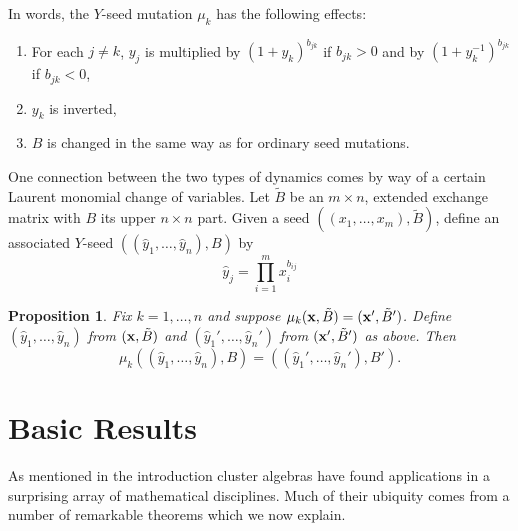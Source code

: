 \documentclass{amsart}
\newtheorem{proposition}[theorem]{Proposition}
\theoremstyle{definition}
\theoremstyle{remark}
\numberwithin{equation}{section}
\newcommand{\x}{{\bf x}}
\begin{document}
	In words, the $Y$-seed mutation $\mu_k$ has the following effects:
	\begin{enumerate}
	\item For each $j \neq k$, $y_j$ is multiplied by $(1+y_k)^{b_{jk}}$ if $b_{jk}>0$ and by $(1+y_k^{-1})^{b_{jk}}$ if $b_{jk}<0$,
	\item $y_k$ is inverted,
	\item $B$ is changed in the same way as for ordinary seed mutations.
	\end{enumerate}
	
	One connection between the two types of dynamics comes by way of a certain Laurent monomial change of variables.  Let $\tilde{B}$ be an $m \times n$, extended exchange matrix with $B$ its upper $n \times n$ part.  Given a seed $((x_1,\ldots, x_m),\tilde{B})$, define an associated $Y$-seed $((\hat{y}_1,\ldots, \hat{y}_n),B)$ by
	\begin{displaymath}
	\hat{y}_j = \prod_{i=1}^m x_i^{b_{ij}}
	\end{displaymath}
	
	\begin{proposition}
	Fix $k=1,\ldots, n$ and suppose $\mu_k(\x,\tilde{B}) = (\x',\tilde{B}')$.  Define $(\hat{y}_1,\ldots, \hat{y}_n)$ from $(\x,\tilde{B})$ and $(\hat{y}_1',\ldots, \hat{y}_n')$ from $(\x',\tilde{B}')$ as above.  Then 
	\begin{displaymath}
	\mu_k((\hat{y}_1,\ldots, \hat{y}_n), B) = ((\hat{y}_1',\ldots, \hat{y}_n'), B').
	\end{displaymath}
	\end{proposition}

\section{Basic Results}\label{sec:basic_theorems}
  As mentioned in the introduction cluster algebras have found applications in a surprising array of mathematical disciplines.  Much of their ubiquity comes from a number of remarkable theorems which we now explain.
\end{document}
